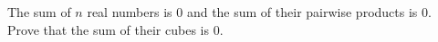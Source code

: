 The sum of $n$ real numbers is $0$ and the sum of their pairwise products is $0$. Prove that the sum of their cubes is $0$.
